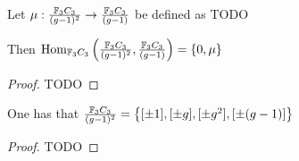 \begin{theorem} \label{thm:f_3c_3_mu}
    Let \( \mu: \frac{{\mathbb{F}}_3C_3}{(g - 1)^2} \to \frac{{\mathbb{F}}_3C_3}{(g - 1)} \) be defined as TODO

    Then \( \operatorname{Hom}_{{\mathbb{F}}_3C_3}\left(\frac{{\mathbb{F}}_3C_3}{(g - 1)^2}, \frac{{\mathbb{F}}_3C_3}{(g - 1)}\right) = \left\{0, \mu\right\} \)
\end{theorem}
\begin{proof}
    TODO
\end{proof}

\begin{lemma} \label{lem:classify_m}
    One has that \( \frac{{\mathbb{F}}_3C_3}{(g - 1)^2} = \left\{[\pm 1], [\pm g], [\pm g^2], [\pm (g - 1)]\right\} \)
\end{lemma}
\begin{proof}
    TODO
\end{proof}

